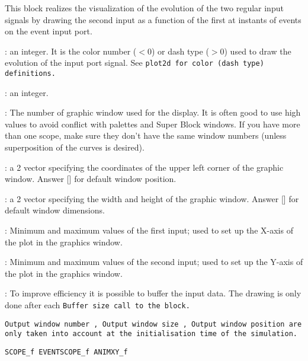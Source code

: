 This block realizes the visualization of the evolution of the two
regular input signals by drawing the second input as a function of
the first at instants of events on the event input port.
\begin{scitem}
\item[{\verb?Curve colors?}]
: an integer. It is the color number ($<$0)
or dash type ($>$0) used to draw the evolution of the input port
signal. See %
\tt plot2d %
\rm for color (dash type) definitions.
\item[{\verb?Line or mark size?}]
: an integer. 
\item[{\verb?Output window number?}]
: The number of graphic window used for the display. It is often good
to use high values to avoid conflict with palettes and Super Block
windows. If you have more than one scope, make sure they don't have
the same window numbers (unless superposition of the curves is
desired).
\item[{\verb?Output window position?}]
: a 2 vector specifying the coordinates of the upper left corner of
the graphic window. Answer [] for default window position.
\item[{\verb?Output window size?}]
: a 2 vector specifying the width and height  of 
the graphic window. Answer [] for default window dimensions.
\item[{\verb?Xmin, Xmax?}]
: Minimum and maximum values of the first input; used to set up the X-axis
of the plot in the graphics window.
\item[{\verb?Ymin, Ymax?}]
: Minimum and maximum values of the second input; used to set up the 
Y-axis of the plot in the graphics window.
\item[{\verb?Buffer size?}]
: To improve efficiency it is possible to buffer the input data. The
drawing is only done after each %
\tt Buffer size %
\rm call to the block.
\end{scitem}%
%
\tt Output window number%
\rm , %
\tt Output window size%
\rm , %
\tt Output window
position %
\rm are only taken into account at the initialisation time of the
simulation. 

{\verb?SCOPE_f EVENTSCOPE_f ANIMXY_f?} \pageref{SCOPEfEVENTSCOPEfANIMXYf}





%
%


